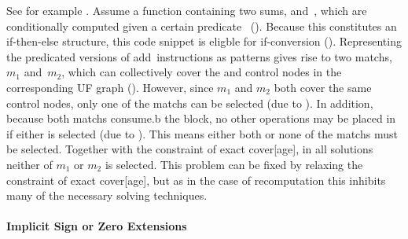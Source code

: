 %
See for example .
%
Assume a \gls{function} containing two sums,  and~, which
are conditionally computed given a certain predicate~
().
%
Because this constitutes an if-then-else structure, this code snippet is eligble
for \gls{if-conversion} ().
%
Representing the predicated versions of add~\glspl{instruction} as
\glspl{pattern} gives rise to two \glspl{match}, $m_1$ and~$m_2$, which can
collectively cover the  and \glspl{control node} in
the corresponding \gls{UF graph} ().
%
However, since $m_1$ and $m_2$ both cover the same \glspl{control node}, only
one of the \glspl{match} can be selected (due to
).
%
In addition, because both \glspl{match} \gls{consume.b} the 
\gls{block}, no other \glspl{operation} may be placed in  if
either is selected (due to ).
%
This means either both or none of the \glspl{match} must be selected.
%
Together with the \gls{constraint} of exact \gls{cover}[age], in all
\glspl{solution} neither of $m_1$ or $m_2$ is selected.
%
This problem can be fixed by relaxing the \gls{constraint} of exact
\gls{cover}[age], but as in the case of \gls{recomputation} this inhibits many
of the necessary solving techniques.


\paragraph{Implicit Sign or Zero Extensions}

